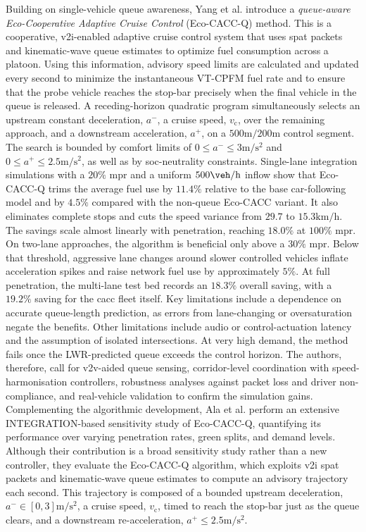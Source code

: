 \mynewline
Building on single-vehicle queue awareness, Yang et al. \cite{Yang2017} introduce a \textit{queue-aware Eco-Cooperative Adaptive Cruise Control} (Eco-CACC-Q) method. This is a cooperative, \ac{v2i}-enabled adaptive cruise control system that uses \ac{spat} packets and kinematic-wave queue estimates to optimize fuel consumption across a platoon. Using this information, advisory speed limits are calculated and updated every second to minimize the instantaneous VT-CPFM fuel rate and to ensure that the probe vehicle reaches the stop-bar precisely when the final vehicle in the queue is released. A receding-horizon quadratic program simultaneously selects an upstream constant deceleration, $a^{-}$, a cruise speed, $v_{\mathrm c}$, over the remaining approach, and a downstream acceleration, $a^{+}$, on a $500\unit{\metre}/200\unit{\metre}$ control segment. The search is bounded by comfort limits of $0\le a^{-}\le3\unit{\metre\per \second\squared}$ and $0\le a^{+}\le2.5\unit{\metre\per\second\squared}$, as well as by \ac{soc}-neutrality constraints.
Single-lane integration simulations with a $20\%$ \ac{mpr} and a uniform $500\unit{\veh\per\hour}$ inflow show that Eco-CACC-Q trims the average fuel use by $11.4\%$ relative to the base car-following model and by $4.5\%$ compared with the non-queue Eco-CACC variant. It also eliminates complete stops and cuts the speed variance from $29.7$ to $15.3\unit{\kilo\metre\per\hour}$. The savings scale almost linearly with penetration, reaching $18.0\%$ at $100\%$ \ac{mpr}. On two-lane approaches, the algorithm is beneficial only above a $30\%$ \ac{mpr}. Below that threshold, aggressive lane changes around slower controlled vehicles inflate acceleration spikes and raise network fuel use by approximately $5\%$. At full penetration, the multi-lane test bed records an $18.3\%$ overall saving, with a $19.2\%$ saving for the \ac{cacc} fleet itself. Key limitations include a dependence on accurate queue-length prediction, as errors from lane-changing or oversaturation negate the benefits. Other limitations include audio or control-actuation latency and the assumption of isolated intersections. At very high demand, the method fails once the LWR-predicted queue exceeds the control horizon. The authors, therefore, call for \ac{v2v}-aided queue sensing, corridor-level coordination with speed-harmonisation controllers, robustness analyses against packet loss and driver non-compliance, and real-vehicle validation to confirm the simulation gains.
\mynewline
Complementing the algorithmic development, Ala et al. \cite{Ala2016} perform an extensive INTEGRATION-based sensitivity study of Eco-CACC-Q, quantifying its performance over varying penetration rates, green splits, and demand levels. Although their contribution is a broad sensitivity study rather than a new controller, they evaluate the Eco-CACC-Q algorithm, which exploits \ac{v2i} \ac{spat} packets and kinematic-wave queue estimates to compute an advisory trajectory each second. This trajectory is composed of a bounded upstream deceleration, $a^{-}\in[0,3]\unit{\metre\per\second\squared}$, a cruise speed, $v_{\mathrm c}$, timed to reach the stop-bar just as the queue clears, and a downstream re-acceleration, $a^{+}\le 2.5\unit{\metre\per\second\squared}$.
